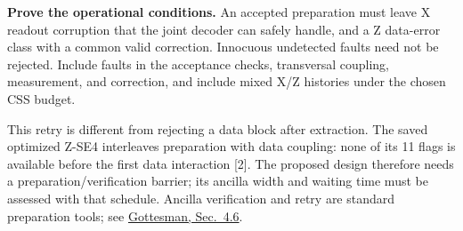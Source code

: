 \documentclass[11pt,a4paper]{article}
\begin{document}
\textbf{Prove the operational conditions.}
An accepted preparation must leave X readout corruption that the joint
decoder can safely handle, and a Z data-error class with a common valid
correction. Innocuous undetected faults need not be rejected. Include faults
in the acceptance checks, transversal coupling, measurement, and correction,
and include mixed X/Z histories under the chosen CSS budget.

This retry is different from rejecting a data block after extraction.
The saved optimized Z-SE4 interleaves preparation with data coupling:
none of its 11 flags is available before the first data interaction [2].
The proposed design therefore needs a preparation/verification barrier;
its ancilla width and waiting time must be assessed with that schedule.
Ancilla verification and retry are standard preparation tools; see
\href{https://arxiv.org/pdf/0904.2557}{Gottesman, Sec.~4.6}.
\end{document}
